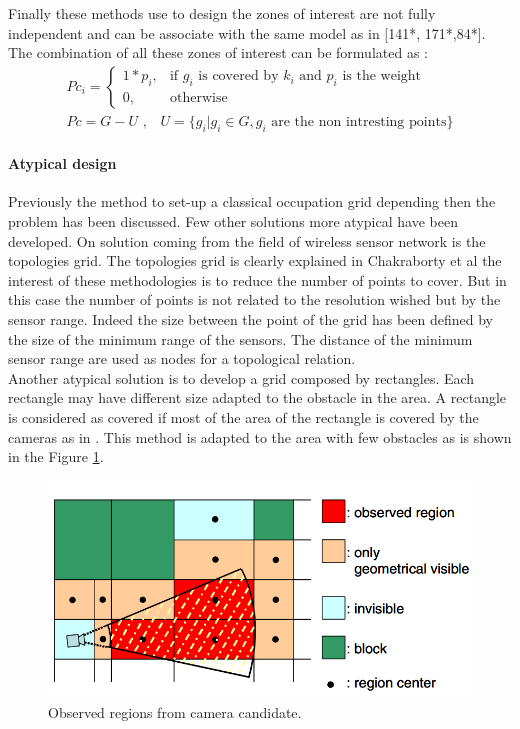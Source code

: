 Finally  these methods use to design the zones of interest are not fully independent and can be associate with the same model as in \cite{141*akbarzadeh2013,171*horster2006,84*xu2011} [141*, 171*,84*]. The combination of all these  zones of interest can be formulated as : 
 \begin{align}\label{eq:PcFull}
Pc_i= \begin{cases} 1*p_i, & \mbox{if } g_i\mbox{ is covered  by $k_i$ and  $p_i$ is the weight} \\ 0, & \mbox{otherwise}  \end{cases}
\\ Pc=G-U \mbox{ ,    }  \mbox{ }U= \{ g_i | g_i \in G, g_i \mbox{ are the non intresting points} \}
\end{align}

   
\paragraph*{Atypical design}  

Previously the method to set-up a classical occupation grid depending then the problem has been discussed. Few other solutions more atypical have been developed. On solution coming from the field of wireless sensor network is the topologies grid. 
 The topologies grid is clearly explained in Chakraborty et al \cite{150*chakrabarty2002} the interest of these methodologies is to reduce the number of points to cover. But in this case the number of points is not related to the resolution wished  but by the sensor range. Indeed the size between the point of the grid has been defined by the size of the minimum range of the sensors. The distance of the minimum sensor range are used as nodes for a topological relation. \\
Another atypical solution is to develop a grid composed by rectangles. Each rectangle may have different size adapted to the obstacle in the area. A rectangle is considered as covered if most of the area of the rectangle is covered by the cameras as in \citep{170*yabuta2008}. This method is adapted to the area with few obstacles as is shown in the Figure \ref{fig:from170}.
\begin{figure}[t!]
\begin{center}
   \includegraphics[width=\linewidth]{img/from170.png}
  \caption{ Observed regions from camera candidate.}\label{fig:from170}
  \endminipage\hfill
  \end{center}
\end{figure}

